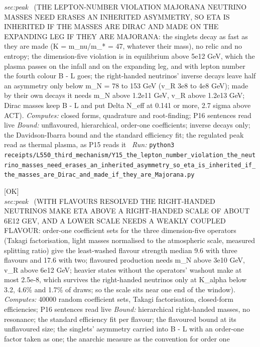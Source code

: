 \begin{description}
\textit{sec:peak} \ (THE LEPTON-NUMBER VIOLATION MAJORANA NEUTRINO MASSES NEED ERASES AN INHERITED ASYMMETRY, SO ETA IS INHERITED IF THE MASSES ARE DIRAC AND MADE ON THE EXPANDING LEG IF THEY ARE MAJORANA: the singlets decay as fast as they are made (K = m\_nu/m\_* = 47, whatever their mass), no relic and no entropy; the dimension-five violation is in equilibrium above 5e12 GeV, which the plasma passes on the infall and on the expanding leg, and with lepton number the fourth colour B - L goes; the right-handed neutrinos' inverse decays leave half an asymmetry only below m\_N = 78 to 153 GeV (v\_R 3e8 to 4e8 GeV); made by their own decays it needs m\_N above 1.2e11 GeV, v\_R above 1.2e13 GeV; Dirac masses keep B - L and put Delta N\_eff at 0.141 or more, 2.7 sigma above ACT). 
\emph{Computes:} closed forms, quadrature and root-finding; P16 sentences read live
 \emph{Bound:} unflavoured, hierarchical, order-one coefficients; inverse decays only; the Davidson-Ibarra bound and the standard efficiency fit; the regulated peak read as thermal plasma, as P15 reads it
\ \emph{Run:} \texttt{python3 receipts/L550\_third\_mechanism/Y15\_the\_lepton\_number\_violation\_the\_neutrino\_masses\_need\_erases\_an\_inherited\_asymmetry\_so\_eta\_is\_inherited\_if\_the\_masses\_are\_Dirac\_and\_made\_if\_they\_are\_Majorana.py}
\item[\label{rcpt:Y16_with_flavours_resolved_the_right_handed_neutrinos_make_eta_above_about_6e12_GeV_and_a_lower_scale_needs_a_weakly_coupled_flavour}\textbf{}\quad\texttt{Y16\_with\_flavours\_resolved\_the\_right\_handed\_neutrinos\_make\_eta\_above\_about\_6e12\_GeV\_and\_a\_lower\_scale\_needs\_a\_weakly\_coupled\_flavour}]\hfill\textsf{[OK]}\\
\textit{sec:peak} \ (WITH FLAVOURS RESOLVED THE RIGHT-HANDED NEUTRINOS MAKE ETA ABOVE A RIGHT-HANDED SCALE OF ABOUT 6E12 GEV, AND A LOWER SCALE NEEDS A WEAKLY COUPLED FLAVOUR: order-one coefficient sets for the three dimension-five operators (Takagi factorisation, light masses normalised to the atmospheric scale, measured splitting ratio) give the least-washed flavour strength median 9.6 with three flavours and 17.6 with two; flavoured production needs m\_N above 3e10 GeV, v\_R above 6e12 GeV; heavier states without the operators' washout make at most 2.5e-8, which survives the right-handed neutrinos only at K\_alpha below 3.2, 4.6\% and 1.7\% of draws; so the scale sits near one end of the window). 
\emph{Computes:} 40000 random coefficient sets, Takagi factorisation, closed-form efficiencies; P16 sentences read live
 \emph{Bound:} hierarchical right-handed masses, no resonance; the standard efficiency fit per flavour; the flavoured bound at its unflavoured size; the singlets' asymmetry carried into B - L with an order-one factor taken as one; the anarchic measure as the convention for order one

\end{description}
